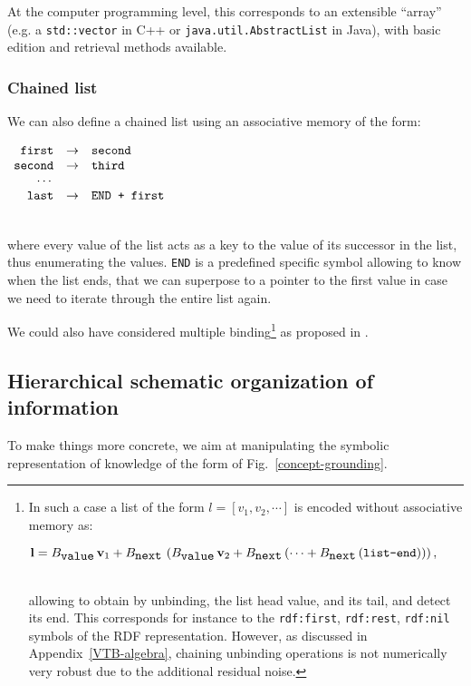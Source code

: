 \documentclass[sn-mathphys]{sn-jnl}
\newcommand{\eqline}[1]{~\vspace{0.1cm}\\\centerline{$#1$}\vspace{0.1cm}\\}
\begin{document}
At the computer programming level, this corresponds to an extensible ``array'' (e.g. a {\tt std::vector} in C++ or {\tt java.util.AbstractList} in Java), with basic edition and retrieval methods available.

\subsubsection{Chained list}

We can also define a chained list using an associative memory of the form:
  \eqline{\begin{array}{rcl}
      \mbox{\tt first} &\rightarrow& \mbox{\tt second} \\
      \mbox{\tt second} &\rightarrow& \mbox{\tt third} \\
      \cdots & \\
      \mbox{\tt last} &\rightarrow& \mbox{\tt END + first}
    \end{array}}
where every value of the list acts as a key to the value of its successor in the list, thus enumerating the values. {\tt END} is a predefined specific symbol allowing to know when the list ends, that we can superpose to a pointer to the first value in case we need to iterate through the entire list again.

We could also have considered multiple binding\footnote{In such a case a list of the form $l = [v_1, v_2, \cdots]$ is encoded without associative memory as: \eqline{\mathbf{l} = B_{\mbox{\tt value}} \, \mathbf{v}_1 + B_{\mbox{\tt next}} \, \left(B_{\mbox{\tt value}} \, \mathbf{v}_2 + B_{\mbox{\tt next}}\left(\cdots + B_{\mbox{\tt next}}\left(\mbox{\tt list-end}\right)\right)\right),}
allowing to obtain by unbinding, the list head value, and its tail, and detect its end. This corresponds for instance to the {\tt rdf:first}, {\tt rdf:rest}, {\tt rdf:nil} symbols of the RDF representation. However, as discussed in Appendix~\ref{VTB-algebra}, chaining unbinding operations is not numerically very robust due to the additional residual noise.} as proposed in \cite{mercier_ontology_2021}.
 
\subsection{Hierarchical schematic organization of information} \label{hierarchical}

To make things more concrete, we aim at manipulating the symbolic representation of knowledge of the form of Fig.~\ref{concept-grounding}.
\end{document}
